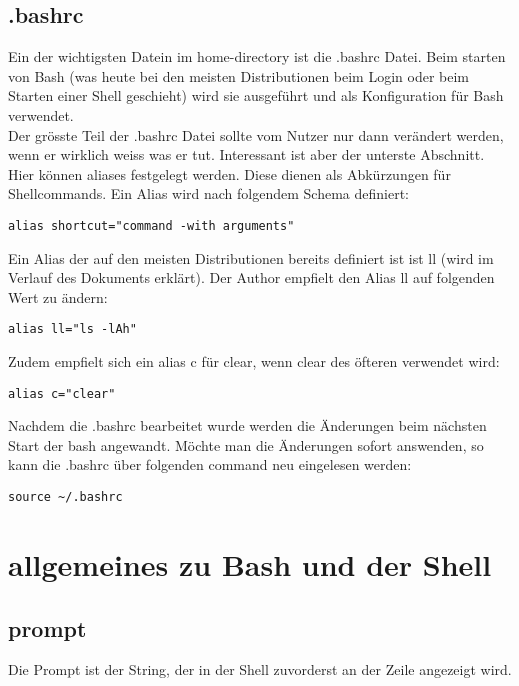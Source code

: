 \documentclass[10pt,paper=a4,final]{scrartcl}
\begin{document}
\subsection{.bashrc}
Ein der wichtigsten Datein im home-directory ist die .bashrc Datei. Beim starten von Bash (was heute bei den meisten Distributionen beim Login oder beim Starten einer Shell geschieht) wird sie ausgef\"uhrt und als Konfiguration f\"ur Bash verwendet.\\
Der gr\"osste Teil der .bashrc Datei sollte vom Nutzer nur dann ver\"andert werden, wenn er wirklich weiss was er tut. Interessant ist aber der unterste Abschnitt. Hier k\"onnen aliases festgelegt werden. Diese dienen als Abk\"urzungen f\"ur Shellcommands. Ein Alias wird nach folgendem Schema definiert:
\begin{lstlisting}[frame=single, style=Shell]
alias shortcut="command -with arguments"
\end{lstlisting}
Ein Alias der auf den meisten Distributionen bereits definiert ist ist ll (wird im Verlauf des Dokuments erkl\"art). Der Author empfielt den Alias ll auf folgenden Wert zu \"andern:
\begin{lstlisting}[frame=single, style=Shell]
alias ll="ls -lAh"
\end{lstlisting}
Zudem empfielt sich ein alias c f\"ur clear, wenn clear des \"ofteren verwendet wird:
\begin{lstlisting}[frame=single]
alias c="clear"
\end{lstlisting}
Nachdem die .bashrc bearbeitet wurde werden die \"Anderungen beim n\"achsten Start der bash angewandt. M\"ochte man die \"Anderungen sofort answenden, so kann die .bashrc \"uber folgenden command neu eingelesen werden:
\begin{lstlisting}[frame=single]
source ~/.bashrc
\end{lstlisting}

\section{allgemeines zu Bash und der Shell}
\subsection{prompt}
Die Prompt ist der String, der in der Shell zuvorderst an der Zeile angezeigt wird.
\end{document}
